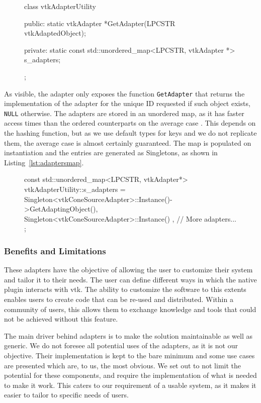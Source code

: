 \begin{figure}[ht!]
    \centering
    \begin{cpp}[label=lst:vtkAdapterutility,caption={C++ interface of the vtkAdapterUtility class.}]
class vtkAdapterUtility
{
public:
	static vtkAdapter *GetAdapter(LPCSTR vtkAdaptedObject);

private:
	static const std::unordered_map<LPCSTR, vtkAdapter *> s_adapters;
};
    \end{cpp}
\end{figure}

As visible, the adapter only exposes the function \verb|GetAdapter| that returns the implementation of the adapter for the unique ID requested if such object exists, \verb|NULL| otherwise. The adapters are stored in an unordered map, as it has faster access times than the ordered counterparts on the average case \cite{stdunord16, stdmapcp55}. This depends on the hashing function, but as we use default types for keys and we do not replicate them, the average case is almost certainly guaranteed. The map is populated on instantiation and the entries are generated as Singletons, as shown in Listing~\ref{lst:adaptersmap}.

\begin{figure}[ht!]
    \centering
    \begin{cpp}[label=lst:adaptersmap,caption={Example of adapters' register instantiation.}]
const std::unordered_map<LPCSTR, vtkAdapter*> vtkAdapterUtility::s_adapters =
{
	{ Singleton<vtkConeSourceAdapter>::Instance()->GetAdaptingObject(), Singleton<vtkConeSourceAdapter>::Instance() },
	// More adapters...
};
    \end{cpp}
\end{figure}

\subsubsection{Benefits and Limitations}

These adapters have the objective of allowing the user to customize their system and tailor it to their needs. The user can define different ways in which the native plugin interacts with \acrshort{vtk}. The ability to customize the software to this extents enables users to create code that can be re-used and distributed. Within a community of users, this allows them to exchange knowledge and tools that could not be achieved without this feature.

The main driver behind adapters is to make the solution maintainable as well as generic. We do not foresee all potential uses of the adapters, as it is not our objective. Their implementation is kept to the bare minimum and some use cases are presented which are, to us, the most obvious. We set out to not limit the potential for these components, and require the implementation of what is needed to make it work. This caters to our requirement of a usable system, as it makes it easier to tailor to specific needs of users.

